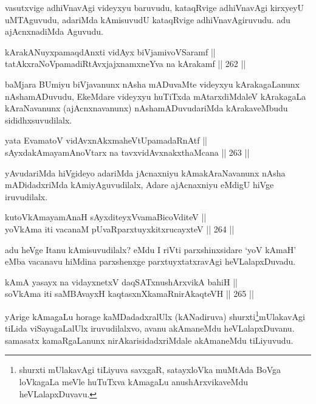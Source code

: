 \begin{artha}
vasutxvige adhiVnavAgi videyxyu baruvudu, kataqRvige adhiVnavAgi
kirxyeyU uMTAguvudu, adariMda kAmisuvudU kataqRvige adhiVnavAgiruvudu.
adu ajAcnxnadiMda Aguvudu.
\end{artha}

\begin{shl}
kArakANuyxpamaqdAnxti vidAyx biVjamivoVSaramf || \\
tatAkxraNoVpamadiRtAvxjajxnamxneYva na kArakamf \hfill || 262 ||  
\end{shl}

\begin{artha}
baMjara BUmiyu biVjavanunx nAsha mADuvaMte videyxyu kArakagaLanunx
nAshamADuvudu, EkeMdare videyxyu huTiTxda mAtarxdiMdaleV
kArakagaLa kAraNavanunx (ajAcnxnavanunx) nAshamADuvudariMda
kArakaveMbudu sididhxsuvudilalx.
\end{artha}

\begin{shl}
yata EvamatoV vidAvxnAkxmaheVtUpamadaRnAtf || \\
sAyxdakAmayamAnoV\s tarx na tavxvidAvxnakxthaMcana \hfill || 263 ||  
\end{shl}

\begin{artha}
yAvudariMda hiVgideyo adariMda jAcnaxniyu kAmakAraNavanunx nAsha mADidadxriMda kAmiyAguvudilalx, Adare ajAcnaxniyu eMdigU hiVge iruvudilalx.
\end{artha}

\begin{shl}
kutoV\s kAmayamAnaH sAyxditeyxVvamaBicoVditeV || \\
yoV\s kAma iti vacanaM pUvaRparxtuyxkitxrucayxteV \hfill || 264 ||  
\end{shl}

\begin{artha}
adu heVge Itanu kAmisuvudilalx? eMdu I riVti parxshinxsidare `yoV\s
kAmaH' eMba vacanavu hiMdina parxshenxge parxtuyxtatxravAgi heVLalapxDuvadu.
\end{artha}


\begin{shl}
kAmA yasayx na vidayxnetxV daqSATxnushArxvikA bahiH || \\
soV\s kAma iti saMBAvayxH kaqtasxnXkamaRnirAkaqteVH \hfill || 265 ||   
\end{shl}

\begin{artha}
yArige kAmagaLu horage kaMDadadxralUlx (kANadiruva) shurxti\footnote{shurxti mUlakavAgi tiLiyuva savxgaR, satayxloVka muMtAda
BoVga loVkagaLa meVle huTuTxva kAmagaLu anushArxvikaveMdu
heVLalapxDuvavu.}mUlakavAgi tiLida viSayagaLalUlx iruvudilalxvo, avanu akAmaneMdu
heVLalapxDuvanu. samasatx kamaRgaLanunx nirAkarisidadxriMdale
akAmaneMdu tiLiyuvudu.
\end{artha}

